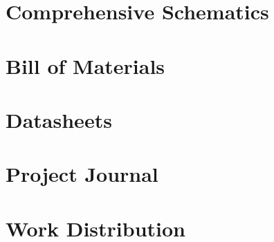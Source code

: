 \documentclass[12pt]{article}
\begin{document}
\appendix
\section{Comprehensive Schematics}
\section{Bill of Materials}
\section{Datasheets}
\section{Project Journal}
\section{Work Distribution}
\end{document}

